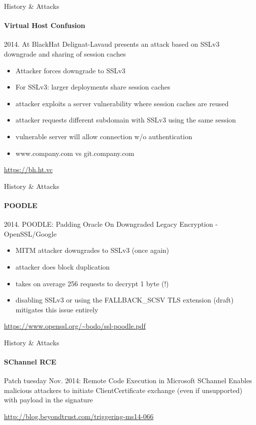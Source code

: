 \documentclass[hyperref={draft}]{beamer}
\begin{document}
\begin{frame}{History \& Attacks}
  \framesubtitle{Virtual Host Confusion}
  2014. At BlackHat Delignat-Lavaud presents an attack based on SSLv3 downgrade and sharing of session caches
  \begin{itemize}
    \item Attacker forces downgrade to SSLv3
    \item For SSLv3: larger deployments share session caches
    \item attacker exploits a server vulnerability where session caches are reused
    \item attacker requests different subdomain with SSLv3 using the same session
    \item vulnerable server will allow connection w/o authentication
    \item www.company.com vs git.company.com
  \end{itemize}
  \tiny
  \url{https://bh.ht.vc}
\end{frame}

\begin{frame}{History \& Attacks}
  \framesubtitle{POODLE}
  2014. POODLE: Padding Oracle On Downgraded Legacy Encryption - OpenSSL/Google
  \begin{itemize}
    \item MITM attacker downgrades to SSLv3 (once again)
    \item attacker does block duplication
    \item takes on average 256 requests to decrypt 1 byte (!)
    \item disabling SSLv3 or using the FALLBACK\_SCSV TLS extension (draft) mitigates this issue entirely
  \end{itemize}
  \tiny
  \url{https://www.openssl.org/~bodo/ssl-poodle.pdf}
\end{frame}

\begin{frame}{History \& Attacks}
  \framesubtitle{SChannel RCE}
  Patch tuesday Nov. 2014: Remote Code Execution in Microsoft SChannel
  \newline
  \newline
  Enables malicious attackers to initiate ClientCertificate exchange (even if unsupported) with payload in the signature

  \tiny
  \url{http://blog.beyondtrust.com/triggering-ms14-066}

\end{frame}
\end{document}
